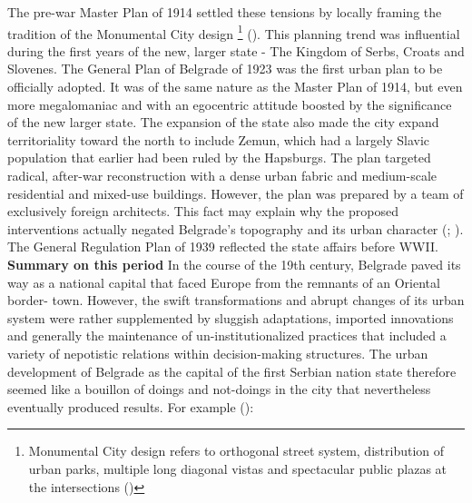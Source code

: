 \documentclass[11pt]{report}
\begin{document}
The pre-war Master Plan of 1914 settled these tensions by locally framing the tradition of the Monumental City design 
\footnote{Monumental City design refers to orthogonal street system, distribution of urban parks, multiple long diagonal vistas and spectacular public plazas at the intersections (\href{Hirt}{\citealt{hirt_belgrade_2009}})}
(\href{Perovic}{\citealt{perovic_iskustva_2008}}).
This planning trend was influential during the first years of the new, larger state - The Kingdom of Serbs, Croats and Slovenes. The General Plan of Belgrade of 1923 was the first urban plan to be officially adopted. It was of the same nature as the Master Plan of 1914, but even more megalomaniac and with an egocentric attitude boosted by the significance of the new larger state.  The expansion of the state also made the city expand territoriality toward the north to include Zemun, which had a largely Slavic population that earlier had been ruled by the Hapsburgs. The plan targeted radical, after-war reconstruction with a dense urban fabric and medium-scale residential and mixed-use buildings. However, the plan was prepared by a team of exclusively foreign architects. This fact may explain why the proposed interventions actually negated Belgrade’s topography and its urban character  (\href{Grozdanic}{\citealt{grozdanic_belgrade_2008}}; \href{Blagojevic}{\citealt{blagojevic_urban_2009}}).
The General Regulation Plan of 1939 reflected the state affairs before WWII.
\\

\textbf{Summary on this period}
In the course of the 19th century, Belgrade paved its way as a national capital that faced Europe from the remnants of an Oriental border- town. However, the swift transformations and abrupt changes of its urban system were rather supplemented by sluggish adaptations, imported innovations and generally the maintenance of un-institutionalized practices that included a variety of nepotistic relations within decision-making structures. The urban development of Belgrade as the capital of the first Serbian nation state therefore seemed like a bouillon of doings and not-doings in the city that nevertheless eventually produced results. For example (\href{Dubravka}{\citealt{dubravka_stojanovic_kontroverze_2015}}):
\end{document}
